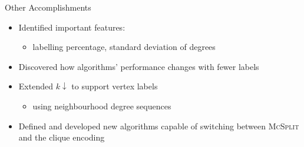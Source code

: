 \documentclass{beamer}
\begin{document}
\begin{frame}{Other Accomplishments}
  \begin{itemize}
  \item Identified important features:
    \begin{itemize}
    \item labelling percentage, standard deviation of degrees
    \end{itemize}
  \item Discovered how algorithms' performance changes with fewer labels
  \item Extended $k{\downarrow}$ to support vertex labels
    \begin{itemize}
    \item using neighbourhood degree sequences
    \end{itemize}
  \item Defined and developed new algorithms capable of switching between
    \textsc{McSplit} and the clique encoding
  \end{itemize}
\end{frame}
\end{document}
